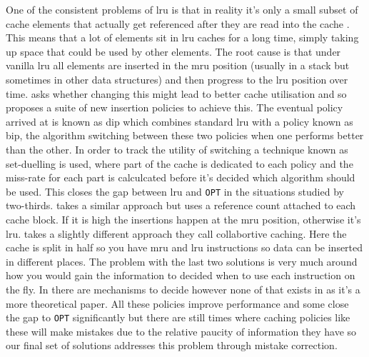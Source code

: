 One of the consistent problems of \gls{lru} is that in reality it's only a small subset of cache elements that actually get referenced after they are read into the cache \cite{qureshiAdaptiveInsertionPolicies2007}. This means that a lot of elements sit in \gls{lru} caches for a long time, simply taking up space that could be used by other elements. The root cause is that under vanilla \gls{lru} all elements are inserted in the \gls{mru} position (usually in a stack but sometimes in other data structures) and then progress to the \gls{lru} position over time. \citeauthor{qureshiAdaptiveInsertionPolicies2007} \cite{qureshiAdaptiveInsertionPolicies2007, qureshiSetDuelingControlledAdaptiveInsertion2008} asks whether changing this might lead to better cache utilisation and so proposes a suite of new insertion policies to achieve this. The eventual policy arrived at is known as \gls{dip} which combines standard \gls{lru} with a policy known as \gls{bip}, the algorithm switching between these two policies when one performs better than the other. In order to track the utility of switching a technique known as set-duelling is used, where part of the cache is dedicated to each policy and the miss-rate for each part is calculcated before it's decided which algorithm should be used. This closes the gap between \gls{lru} and \texttt{OPT} in the situations studied by two-thirds. \citet{sreedharanCacheReplacementPolicy2017} takes a similar approach but uses a reference count attached to each cache block. If it is high the insertions happen at the \gls{mru} position, otherwise it's \gls{lru}. \citet{guTheoryPotentialLRUMRU2011} takes a slightly different approach they call collabortive caching. Here the cache is split in half so you have \gls{mru} and \gls{lru} instructions so data can be inserted in different places. The problem with the last two solutions is very much around how you would gain the information to decided when to use each instruction on the fly. In \citet{sreedharanCacheReplacementPolicy2017, qureshiAdaptiveInsertionPolicies2007} there are mechanisms to decide however none of that exists in \citet{guTheoryPotentialLRUMRU2011} as it's a more theoretical paper. All these policies improve performance and some close the gap to \texttt{OPT} significantly but there are still times where caching policies like these will make mistakes due to the relative paucity of information they have so our final set of solutions addresses this problem through mistake correction.

